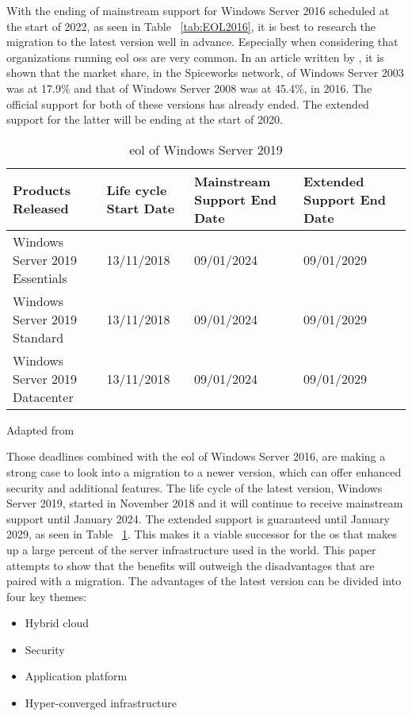 With the ending of mainstream support for Windows Server 2016 scheduled at the start of 2022, as seen in Table ~\ref{tab:EOL2016}, it is best to research the migration to the latest version well in advance. Especially when considering that organizations running \acrfull{eol} \acrshort{os}s are very common. In an article written by \textcite{Tsai2016}, it is shown that the market share, in the Spiceworks network, of Windows Server 2003 was at 17.9\% and that of Windows Server 2008 was at 45.4\%, in 2016. The official support for both of these versions has already ended. The extended support for the latter will be ending at the start of 2020. 

\begin{table}[ht]
	\centering
	\begin{adjustbox}{width=1\textwidth}
		\begin{tabular}{l|l|l|ll}
			Products Released & Life cycle Start Date & Mainstream Support End Date & Extended Support End Date &\\
			\hline
			Windows Server 2019 Essentials & 13/11/2018 & 09/01/2024 & 09/01/2029 &\\
			Windows Server 2019 Standard & 13/11/2018 & 09/01/2024 & 09/01/2029 &\\
			Windows Server 2019 Datacenter & 13/11/2018 & 09/01/2024 & 09/01/2029 &\\
		\end{tabular}
	\end{adjustbox}
	\caption[\acrshort{eol} \acrshort{ws}2019]{\acrshort{eol} of Windows Server 2019}
	\scriptsize	
	Adapted from \cite{MicrosoftEOL2019}
	\label{tab:EOL2019}
\end{table}

Those deadlines combined with the \acrshort{eol} of Windows Server 2016, are making a strong case to look into a migration to a newer version, which can offer enhanced security and additional features. The life cycle of the latest version, Windows Server 2019, started in November 2018 and it will continue to receive mainstream support until January 2024. The extended support is guaranteed until January 2029, as seen in Table ~\ref{tab:EOL2019}. This makes it a viable successor for the \acrshort{os} that makes up a large percent of the server infrastructure used in the world. This paper attempts to show that the benefits will outweigh the disadvantages that are paired with a migration. The advantages of the latest version can be divided into four key themes:

\begin{itemize}
	\item Hybrid cloud
	\item Security
	\item Application platform
	\item Hyper-converged infrastructure
\end{itemize}

